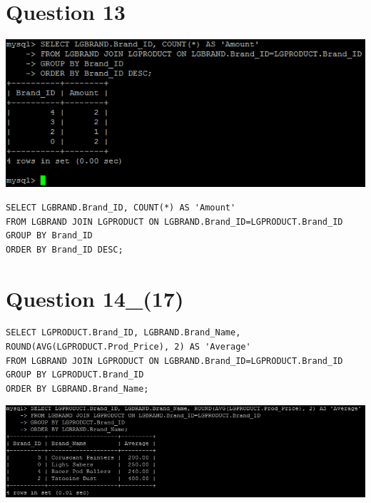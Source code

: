\documentclass[a4paper,10pt]{article}
\begin{document}
\section {Question 13}
\includegraphics{Queries/Question_13/Question_13_screenshot.PNG}
\lstset{
            language=SQL,
            breaklines=true
            }
        \begin{lstlisting}[frame=single]
        SELECT LGBRAND.Brand_ID, COUNT(*) AS 'Amount'
FROM LGBRAND JOIN LGPRODUCT ON LGBRAND.Brand_ID=LGPRODUCT.Brand_ID
GROUP BY Brand_ID
ORDER BY Brand_ID DESC;

        \end{lstlisting}
\section {Question 14_(17)}
\lstset{
            language=SQL,
            breaklines=true
            }
        \begin{lstlisting}[frame=single]
        SELECT LGPRODUCT.Brand_ID, LGBRAND.Brand_Name, ROUND(AVG(LGPRODUCT.Prod_Price), 2) AS 'Average'
FROM LGBRAND JOIN LGPRODUCT ON LGBRAND.Brand_ID=LGPRODUCT.Brand_ID
GROUP BY LGPRODUCT.Brand_ID
ORDER BY LGBRAND.Brand_Name;

        \end{lstlisting}
\includegraphics{Queries/Question_14_(17)/Q14_screenshot.jpg}
\end{document}
